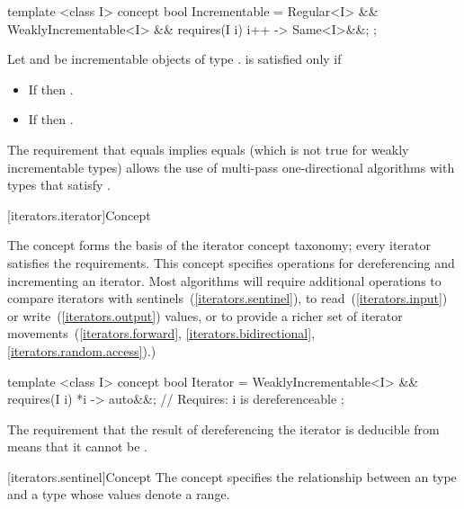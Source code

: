 %
\begin{codeblock}
  template <class I>
  concept bool Incrementable =
    Regular<I> &&
    WeaklyIncrementable<I> &&
    requires(I i) {
      { i++ } -> Same<I>&&;
    };
\end{codeblock}

\pnum
Let  and  be incrementable objects of type .
 is satisfied only if

\begin{itemize}
\item If  then .
\item If  then .
\end{itemize}

\pnum
\enternote The requirement that  equals  implies  equals 
(which is not true for weakly incrementable types) allows the use of multi-pass one-directional
algorithms with types that satisfy .\exitnote

[iterators.iterator]{Concept }

\pnum
The  concept forms
the basis of the iterator concept taxonomy; every iterator satisfies the
 requirements. This
concept specifies operations for dereferencing and incrementing
an iterator. Most algorithms will require additional operations
to compare iterators with sentinels~(\ref{iterators.sentinel}), to
read~(\ref{iterators.input}) or write~(\ref{iterators.output}) values, or
to provide a richer set of iterator movements~(\ref{iterators.forward},
\ref{iterators.bidirectional}, \ref{iterators.random.access}).)

%
\begin{codeblock}
  template <class I>
  concept bool Iterator =
    WeaklyIncrementable<I> &&
    requires(I i) {
      { *i } -> auto&&; // Requires: i is dereferenceable
    };
\end{codeblock}

\pnum
\enternote The requirement that the result of dereferencing the iterator is deducible from
 means that it cannot be .\exitnote

[iterators.sentinel]{Concept }
\pnum
The  concept
specifies the relationship
between an  type and a  type whose values
denote a range.

